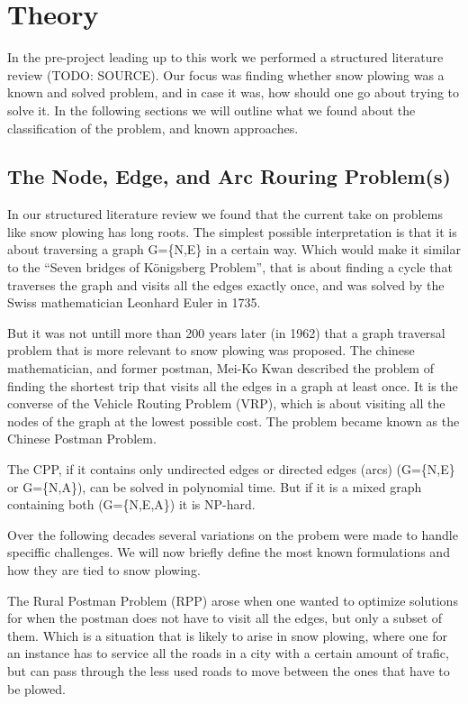 \chapter{Theory}
\label{theory}

In the pre-project leading up to this work we performed a structured literature review (TODO: SOURCE). Our focus was finding whether snow plowing was a known and solved problem, and in case it was, how should one go about trying to solve it. In the following sections we will outline what we found about the classification of the problem, and known approaches.

\section{The Node, Edge, and Arc Rouring Problem(s)}
\label{the_nearp}
In our structured literature review we found that the current take on problems like snow plowing has long roots. The simplest possible interpretation is that it is about traversing a graph G=\{N,E\} in a certain way. Which would make it similar to the “Seven bridges of Königsberg Problem”, that is about finding a cycle that traverses the graph and visits all the edges exactly once, and was solved by the Swiss mathematician Leonhard Euler in 1735.

But it was not untill more than 200 years later (in 1962) that a graph traversal problem that is more relevant to snow plowing was proposed. The chinese mathematician, and former postman, Mei-Ko Kwan described the problem of finding the shortest trip that visits all the edges in a graph at least once. It is the converse of the Vehicle Routing Problem (VRP), which is about visiting all the nodes of the graph at the lowest possible cost. The problem became known as the Chinese Postman Problem.

The CPP, if it contains only undirected edges or directed edges (arcs) (G=\{N,E\} or G=\{N,A\}), can be solved in polynomial time. But if it is a mixed graph containing both (G=\{N,E,A\}) it is NP-hard.

Over the following decades several variations on the probem were made to handle speciffic challenges. We will now briefly define the most known formulations and how they are tied to snow plowing.

The Rural Postman Problem (RPP) arose when one wanted to optimize solutions for when the postman does not have to visit all the edges, but only a subset of them. Which is a situation that is likely to arise in snow plowing, where one for an instance has to service all the roads in a city with a certain amount of trafic, but can pass through the less used roads to move between the ones that have to be plowed.

